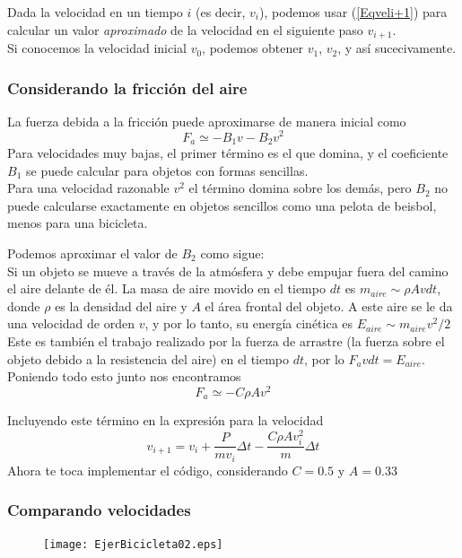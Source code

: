 \begin{frame}
Dada la velocidad en un tiempo $i$ (es decir, $v_{i}$), podemos usar (\ref{Eqveli+1}) para calcular un valor \textit{aproximado} de la velocidad en el siguiente paso $v_{i+1}$.
\\
\medskip
Si conocemos la velocidad inicial $v_{0}$, podemos obtener $v_{1}$, $v_{2}$, y así sucecivamente.
\end{frame}
\begin{frame}
\frametitle{Considerando la fricción del aire}
La fuerza debida a la fricción puede aproximarse de manera inicial como
\begin{equation}\label{EqFfriccion}
F_{a} \simeq - B_{1} v - B_{2} v^{2}
\end{equation}
Para velocidades muy bajas, el primer término es el que domina, y el coeficiente $B_{1}$ se puede calcular para objetos con formas sencillas.
\\
\medskip
Para una velocidad razonable $v^{2}$ el término domina sobre los demás, pero $B_{2}$ no puede calcularse exactamente en objetos sencillos como una pelota de beisbol, menos para una bicicleta.
\end{frame}
\begin{frame}
Podemos aproximar el valor de $B_{2}$ como sigue:
\\
\medskip
Si un objeto se mueve a través de la atmósfera y debe empujar fuera del camino el aire delante de él. La masa de aire movido en el tiempo $dt$ es $m_{aire} \sim \rho Avdt$, donde $\rho$ es la densidad del aire y $A$ el área frontal del objeto. A este aire se le da una velocidad de orden $v$, y por lo tanto, su energía cinética es $E_{aire} \sim m_{aire} v^{2} /2$
\\
\medskip
Este es también el trabajo realizado por la fuerza de arrastre (la fuerza sobre el objeto debido a la resistencia del aire) en el tiempo $dt$, por lo $F_{a}vdt = E_{aire}$. Poniendo todo esto junto nos encontramos
\[ F_{a} \simeq - C \rho A v^{2} \]
\end{frame}
\begin{frame}
Incluyendo este término en la expresión para la velocidad
\begin{equation}\label{Eqvelifriccion}
v_{i+1} = v_{i} + \dfrac{P}{m v_{i}} \Delta t - \dfrac{C \rho A v_{i}^{2}}{m} \Delta t
\end{equation}
Ahora te toca implementar el código, considerando $C = 0.5$ y $A=0.33$
\end{frame}
\begin{frame}
\frametitle{Comparando velocidades}
\begin{figure}
	\centering
	\texttt{[image: EjerBicicleta02.eps]}
\end{figure}
\end{frame}
